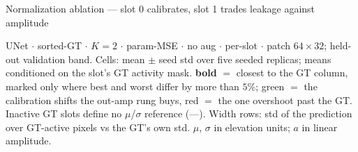 \begin{frame}{Normalization ablation --- slot 0 calibrates, slot 1 trades leakage against amplitude}
  \par\vspace{3pt}
  \parbox{0.86\textwidth}{\tiny\color{soft} UNet $\cdot$ sorted-GT $\cdot$ $K{=}2$ $\cdot$ param-MSE $\cdot$ no aug $\cdot$ per-slot $\cdot$ patch $64{\times}32$; held-out validation band. Cells: mean $\pm$ seed std over five seeded replicas; means conditioned on the slot's GT activity mask. \textbf{bold} $=$ closest to the \textcolor{good}{GT} column, marked only where best and worst differ by more than $5\%$; \textcolor{good}{green} $=$ the calibration shifts the out-amp rung buys, \textcolor{accent}{red} $=$ the one overshoot past the GT. Inactive GT slots define no $\mu$/$\sigma$ reference (---). Width rows: std of the prediction over GT-active pixels vs the GT's own std. $\mu$, $\sigma$ in elevation units; $a$ in linear amplitude.\par}
    

\end{frame}
